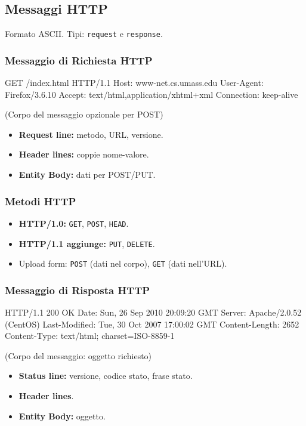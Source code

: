 \documentclass{article}
\begin{document}
\subsection{Messaggi HTTP}
Formato ASCII. Tipi: \texttt{request} e \texttt{response}.
\subsubsection{Messaggio di Richiesta HTTP}
\begin{textcode}
GET /index.html HTTP/1.1
Host: www-net.cs.umass.edu
User-Agent: Firefox/3.6.10
Accept: text/html,application/xhtml+xml
Connection: keep-alive

(Corpo del messaggio opzionale per POST)
\end{textcode}
\begin{itemize}
    \item \textbf{Request line:} metodo, URL, versione.
    \item \textbf{Header lines:} coppie nome-valore.
    \item \textbf{Entity Body:} dati per POST/PUT.
\end{itemize}

\subsubsection{Metodi HTTP}
\begin{itemize}
    \item \textbf{HTTP/1.0:} \texttt{GET}, \texttt{POST}, \texttt{HEAD}.
    \item \textbf{HTTP/1.1 aggiunge:} \texttt{PUT}, \texttt{DELETE}.
    \item Upload form: \texttt{POST} (dati nel corpo), \texttt{GET} (dati nell'URL).
\end{itemize}

\subsubsection{Messaggio di Risposta HTTP}
\begin{textcode}
HTTP/1.1 200 OK
Date: Sun, 26 Sep 2010 20:09:20 GMT
Server: Apache/2.0.52 (CentOS)
Last-Modified: Tue, 30 Oct 2007 17:00:02 GMT
Content-Length: 2652
Content-Type: text/html; charset=ISO-8859-1

(Corpo del messaggio: oggetto richiesto)
\end{textcode}
\begin{itemize}
    \item \textbf{Status line:} versione, codice stato, frase stato.
    \item \textbf{Header lines}.
    \item \textbf{Entity Body:} oggetto.
\end{itemize}
\end{document}
